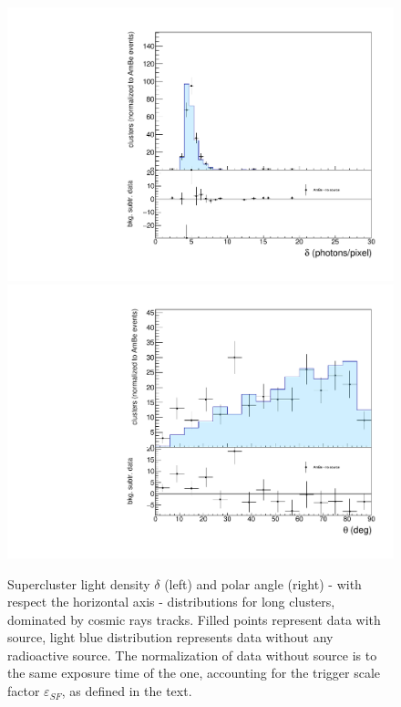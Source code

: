 \begin{figure}[ht]
  \begin{center}
  \includegraphics[width=0.45\linewidth]{figures/density_cosmics}
  \includegraphics[width=0.45\linewidth]{figures/inclination_cosmics}

  \caption{Supercluster light density $\delta$ (left) and polar angle
    (right) - with respect the horizontal axis - distributions for
    long clusters, dominated by cosmic rays tracks.  Filled points
    represent data with \ambe source, light blue distribution
    represents data without any radioactive source.  The normalization
    of data without source is to the same exposure time of the \ambe
    one, accounting for the trigger scale factor $\varepsilon_{SF}$,
    as defined in the text.  \label{fig:cosmics}}

\end{center}
\end{figure}

